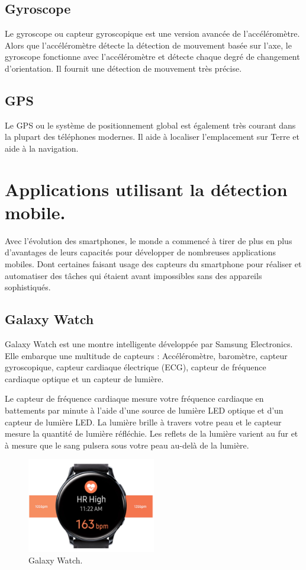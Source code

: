 \subsection{Gyroscope}
Le gyroscope ou capteur gyroscopique est une version avancée de l'accéléromètre. Alors que l'accéléromètre détecte la détection de mouvement basée sur l'axe, le gyroscope fonctionne avec l'accéléromètre et détecte chaque degré de changement d'orientation. Il fournit une détection de mouvement très précise.

\subsection{GPS}
Le GPS ou le système de positionnement global est également très courant dans la plupart des téléphones modernes. Il aide à localiser l'emplacement sur Terre et aide à la navigation.

\section{Applications utilisant la détection mobile.}
Avec l'évolution des smartphones, le monde a commencé à tirer de plus en plus d'avantages de leurs capacités pour développer de nombreuses applications mobiles. Dont certaines faisant usage des capteurs du smartphone pour réaliser et automatiser des tâches qui étaient avant impossibles sans des appareils sophistiqués.
\subsection{Galaxy Watch}
Galaxy Watch est une montre intelligente développée par Samsung Electronics. Elle embarque une multitude de capteurs : Accéléromètre, baromètre, capteur gyroscopique, capteur cardiaque électrique (ECG), capteur de fréquence cardiaque optique et un capteur de lumière.

Le capteur de fréquence cardiaque mesure votre fréquence cardiaque en battements par minute à l'aide d'une source de lumière LED optique et d'un capteur de lumière LED. La lumière brille à travers votre peau et le capteur mesure la quantité de lumière réfléchie. Les reflets de la lumière varient au fur et à mesure que le sang pulsera sous votre peau au-delà de la lumière.
\begin{figure}[h!]
    \center
    \includegraphics[width=0.5\textwidth]{Images/chapter1/galaxyWatch.PNG}
    \caption{Galaxy Watch.}
    \label{fig:Application}
\end{figure}
